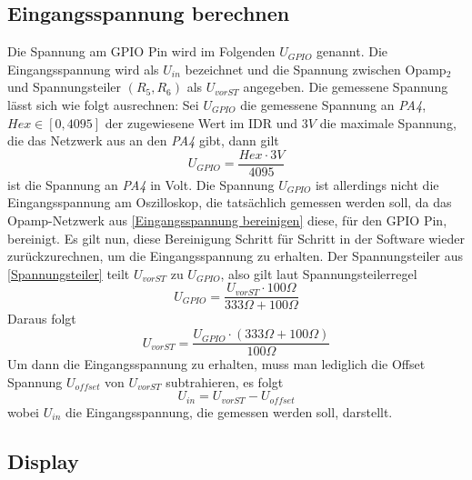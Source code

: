 \subsection{Eingangsspannung berechnen}
Die Spannung am GPIO Pin  wird im Folgenden $U_{GPIO}$ genannt. \newline
Die Eingangsspannung wird als $U_{in}$ bezeichnet und die Spannung zwischen Opamp$_2$
und Spannungsteiler $(R_5, R_6)$ als $U_{vorST}$ angegeben.
\newline \newline
Die gemessene Spannung lässt sich wie folgt ausrechnen: \newline
Sei $U_{GPIO}$ die gemessene Spannung an \textit{PA4}, $Hex \in [0, 4095]$ der zugewiesene Wert im IDR
und $3V$ die maximale Spannung, die das Netzwerk aus  an den \textit{PA4} gibt,
dann gilt
$$
	U_{GPIO} = \frac{Hex \cdot 3V}{4095}
$$
ist die Spannung an \textit{PA4} in Volt.
\newline \newline
Die Spannung $U_{GPIO}$ ist allerdings nicht die Eingangsspannung am Oszilloskop, die tatsächlich gemessen werden soll, da
das Opamp-Netzwerk aus \ref{Eingangsspannung bereinigen} diese, für den GPIO Pin, bereinigt.
Es gilt nun, diese Bereinigung Schritt für Schritt in der Software wieder zurückzurechnen, um die Eingangsspannung zu erhalten. \newline
Der Spannungsteiler aus \ref{Spannungsteiler} teilt $U_{vorST}$
zu $U_{GPIO}$, also gilt laut Spannungsteilerregel
$$
	U_{GPIO} = \frac{U_{vorST} \cdot 100 \Omega}{333 \Omega + 100 \Omega}
$$
Daraus folgt
$$
	U_{vorST} = \frac{U_{GPIO} \cdot (333 \Omega + 100 \Omega)}{100 \Omega}
$$
\newline\newline
Um dann die Eingangsspannung zu erhalten, muss man lediglich die Offset Spannung $U_{offset}$
von $U_{vorST}$ subtrahieren, es folgt
$$
	U_{in} = U_{vorST} - U_{offset}
$$
wobei $U_{in}$ die Eingangsspannung, die gemessen werden soll, darstellt.


\subsection{Display}

